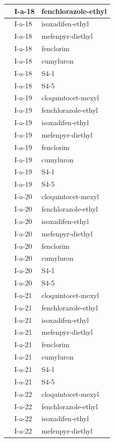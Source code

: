 \documentclass[11pt,a4paper]{article}
\begin{document}
\begin{table}[h]
\begin{tabular}{|l|l|l|}
 & I-a-18 & fenchlorazole-ethyl \\ \hline
 & I-a-18 & isoxadifen-ethyl \\ \hline
 & I-a-18 & mefenpyr-diethyl \\ \hline
 & I-a-18 & fenclorim \\ \hline
 & I-a-18 & cumyluron \\ \hline
 & I-a-18 & S4-1 \\ \hline
 & I-a-18 & S4-5 \\ \hline
 & I-a-19 & cloquintocet-mexyl \\ \hline
 & I-a-19 & fenchlorazole-ethyl \\ \hline
 & I-a-19 & isoxadifen-ethyl \\ \hline
 & I-a-19 & mefenpyr-diethyl \\ \hline
 & I-a-19 & fenclorim \\ \hline
 & I-a-19 & cumyluron \\ \hline
 & I-a-19 & S4-1 \\ \hline
 & I-a-19 & S4-5 \\ \hline
 & I-a-20 & cloquintocet-mexyl \\ \hline
 & I-a-20 & fenchlorazole-ethyl \\ \hline
 & I-a-20 & isoxadifen-ethyl \\ \hline
 & I-a-20 & mefenpyr-diethyl \\ \hline
 & I-a-20 & fenclorim \\ \hline
 & I-a-20 & cumyluron \\ \hline
 & I-a-20 & S4-1 \\ \hline
 & I-a-20 & S4-5 \\ \hline
 & I-a-21 & cloquintocet-mexyl \\ \hline
 & I-a-21 & fenchlorazole-ethyl \\ \hline
 & I-a-21 & isoxadifen-ethyl \\ \hline
 & I-a-21 & mefenpyr-diethyl \\ \hline
 & I-a-21 & fenclorim \\ \hline
 & I-a-21 & cumyluron \\ \hline
 & I-a-21 & S4-1 \\ \hline
 & I-a-21 & S4-5 \\ \hline
 & I-a-22 & cloquintocet-mexyl \\ \hline
 & I-a-22 & fenchlorazole-ethyl \\ \hline
 & I-a-22 & isoxadifen-ethyl \\ \hline
 & I-a-22 & mefenpyr-diethyl \\ \hline

\end{tabular}
\end{table}
\end{document}
